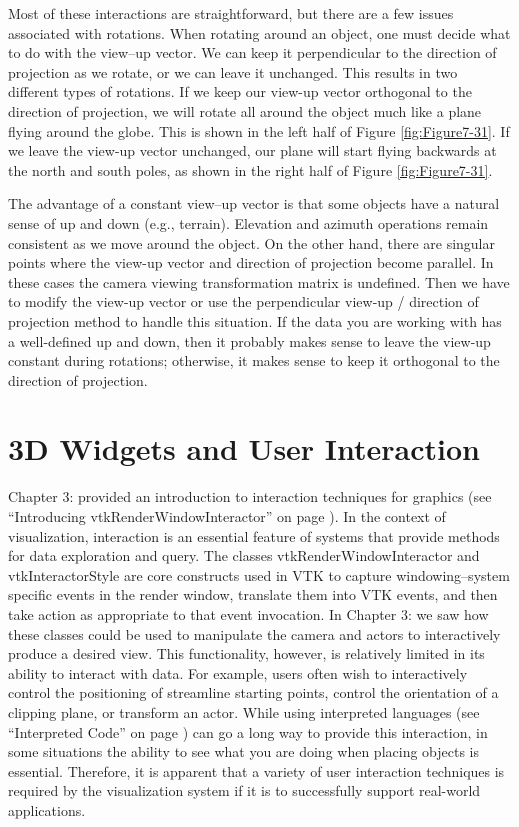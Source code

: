Most of these interactions are straightforward, but there are a few issues associated with rotations. When rotating around an object, one must decide what to do with the view--up vector. We can keep it perpendicular to the direction of projection as we rotate, or we can leave it unchanged. This results in two different types of rotations. If we keep our view-up vector orthogonal to the direction of projection, we will rotate all around the object much like a plane flying around the globe. This is shown in the left half of Figure \ref{fig:Figure7-31}. If we leave the view-up vector unchanged, our plane will start flying backwards at the north and south poles, as shown in the right half of Figure \ref{fig:Figure7-31}.

The advantage of a constant view--up vector is that some objects have a natural sense of up and down (e.g., terrain). Elevation and azimuth operations remain consistent as we move around the object. On the other hand, there are singular points where the view-up vector and direction of projection become parallel. In these cases the camera viewing transformation matrix is undefined. Then we have to modify the view-up vector or use the perpendicular view-up / direction of projection method to handle this situation. If the data you are working with has a well-defined up and down, then it probably makes sense to leave the view-up constant during rotations; otherwise, it makes sense to keep it orthogonal to the direction of projection.


\section{3D Widgets and User Interaction}
\label{sec:3D_widgets_user_interaction}

Chapter 3:  provided an introduction to interaction techniques for graphics (see ``Introducing vtkRenderWindowInteractor'' on page \pageref{subsec:introducing_vtkRenderWindowInteractor} ).
In the context of visualization, interaction is an essential feature of systems that provide methods for data exploration and query. The classes
vtkRenderWindowInteractor and vtkInteractorStyle are core constructs used in VTK to capture windowing--system specific events in the render window, translate them into VTK events, and then take action as appropriate to that event invocation.
In Chapter 3:  we saw how these classes could be used to manipulate the camera and actors to interactively produce a desired view. This functionality, however, is relatively limited in its ability to interact with data. For example, users often wish to interactively control the positioning of streamline starting points, control the orientation of a clipping plane, or transform an actor. While using interpreted languages (see ``Interpreted Code'' on page \pageref{subsec:interpreted_code} ) can go a long way to provide this interaction, in some situations the ability to see what you are doing when placing objects is essential. Therefore, it is apparent that a variety of user interaction techniques is required by the visualization system if it is to successfully support real-world applications.

